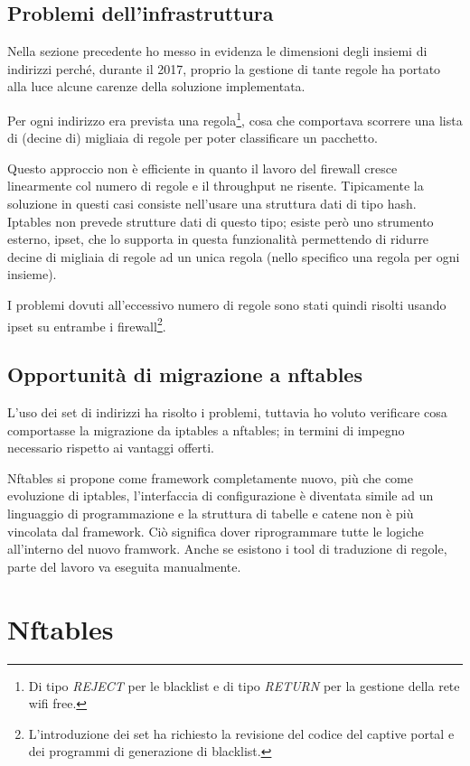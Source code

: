 \section{Problemi dell'infrastruttura}

Nella sezione precedente ho messo in evidenza le dimensioni degli insiemi di
indirizzi perché, durante il 2017, proprio la gestione di tante regole ha 
portato alla luce alcune carenze della soluzione implementata.

Per ogni indirizzo era prevista una regola\footnote{Di tipo {\em
REJECT} per le blacklist e di tipo {\em RETURN} per la gestione della rete wifi
free.}, cosa che comportava scorrere una lista di (decine di) migliaia di
regole per poter classificare un pacchetto.

Questo approccio non è efficiente in quanto il lavoro del firewall cresce
linearmente col numero di regole e il throughput ne risente.
Tipicamente la soluzione in questi casi consiste nell'usare una struttura dati
di tipo hash.
Iptables non prevede strutture dati di questo tipo; esiste per\`o uno
strumento esterno, ipset, che lo supporta in questa funzionalità permettendo di
ridurre decine di migliaia di regole ad un unica regola (nello specifico una
regola per ogni insieme).

I problemi dovuti all'eccessivo numero di regole sono stati quindi risolti
usando ipset su entrambe i firewall\footnote{L'introduzione dei set ha
richiesto la revisione del codice del captive portal e dei programmi di
generazione di blacklist.}.

\section{Opportunità di migrazione a nftables}

L'uso dei set di indirizzi ha risolto i problemi, tuttavia ho voluto
verificare cosa comportasse la migrazione da iptables a nftables; in termini
di impegno necessario rispetto ai vantaggi offerti.

Nftables si propone come framework completamente nuovo, più che come
evoluzione di iptables, l'interfaccia di configurazione è diventata simile ad
un linguaggio di programmazione e la struttura di tabelle e catene non
\`e pi\`u vincolata dal framework. Ci\`o significa dover riprogrammare tutte le
logiche all'interno del nuovo framwork. Anche se esistono i tool di traduzione
di regole, parte del lavoro va eseguita manualmente.

\chapter{Nftables}

